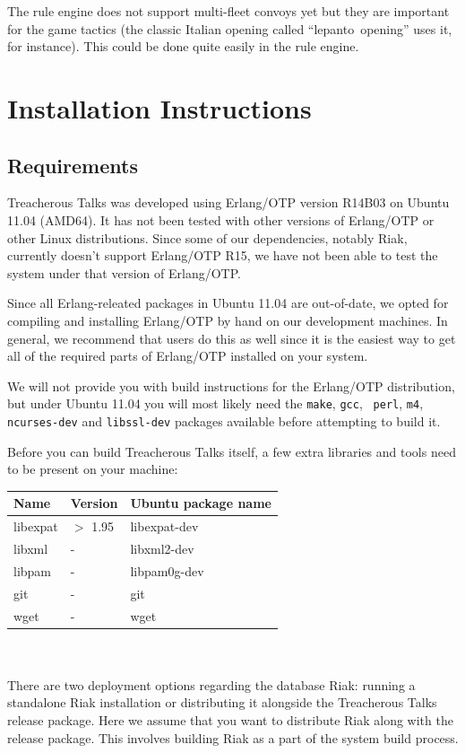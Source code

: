 \documentclass[11pt,a4paper]{report}
\begin{document}
The rule engine does not support multi-fleet convoys yet but they are important
for the game tactics (the classic Italian opening called ``lepanto~opening''
uses it, for instance). This could be done quite easily in the rule engine.

\appendix
\chapter{Installation Instructions}
\section{Requirements}
Treacherous Talks was developed using Erlang/OTP version R14B03 on Ubuntu 11.04
(AMD64). It has not been tested with other versions of Erlang/OTP or other Linux
distributions. Since some of our dependencies, notably Riak, currently doesn't
support Erlang/OTP R15, we have not been able to test the system under that
version of Erlang/OTP.

Since all Erlang-releated packages in Ubuntu 11.04 are out-of-date, we opted for
compiling and installing Erlang/OTP by hand on our development machines. In
general, we recommend that users do this as well since it is the easiest way to
get all of the required parts of Erlang/OTP installed on your system.

We will not provide you with build instructions for the Erlang/OTP distribution,
but under Ubuntu 11.04 you will most likely need the {\tt make}, {\tt gcc}, {\tt
  perl}, {\tt m4}, {\tt ncurses-dev} and {\tt libssl-dev} packages available
before attempting to build it.

Before you can build Treacherous Talks itself, a few extra libraries and tools
need to be present on your machine: \\

\begin{tabular}{lll}
  Name & Version & Ubuntu package name \\ \hline
  libexpat & $>$ 1.95 & libexpat-dev \\
  libxml   & -        & libxml2-dev \\
  libpam   & -        & libpam0g-dev \\
  git      & -        & git \\
  wget     & -        & wget \\
\end{tabular} \\
\\
There are two deployment options regarding the database Riak: running a
standalone Riak installation or distributing it alongside the Treacherous Talks
release package. Here we assume that you want to distribute Riak along with the
release package. This involves building Riak as a part of the system build
process.
\end{document}
